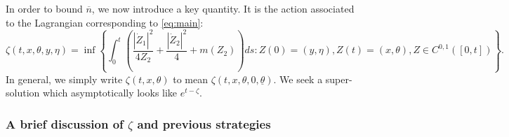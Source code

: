 \documentclass[11pt]{article}    %
\newtheorem{lem}[theorem]{Lemma}
\begin{document}
%
%
%
%
%
%
%
In order to bound $\overline n$, we now introduce a key quantity. It is the action associated to the Lagrangian corresponding to \eqref{eq:main}:
\[
	\zeta(t,x,\theta,y,\eta) = \inf\left\{
		\int_0^t \left(\frac{|\dot Z_1|^2}{4Z_2} + \frac{|\dot Z_2|^2}{4} + m(Z_2)\right)ds
			: Z(0) = (y,\eta), Z(t) = (x,\theta), Z\in C^{0,1}\left( [0,t] \right)
	 \right\}.
\]
In general, we simply write $\zeta(t,x,\theta)$ to mean $\zeta(t,x,\theta,0,\underline\theta)$. We seek a super-solution which asymptotically looks like $e^{t - \zeta}$.

%


\subsubsection*{A brief discussion of $\zeta$ and previous strategies}
\end{document}
